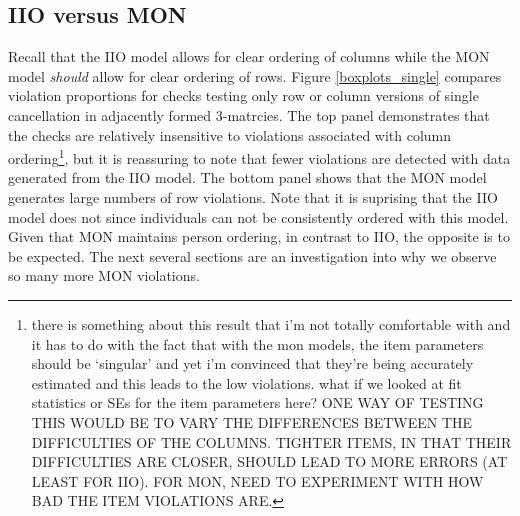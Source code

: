 \documentclass[12pt]{article}
\begin{document}
\subsection{IIO versus MON} \label{iio_mon}
Recall that the IIO model allows for clear ordering of columns while the MON model {\em should} allow for clear ordering of rows. Figure \ref{boxplots_single} compares violation proportions for checks testing only row or column versions of single cancellation in adjacently formed 3-matrcies. The top panel demonstrates that the checks are relatively insensitive to violations associated with column ordering\footnote{there is something about this result that i'm not totally comfortable with and it has to do with the fact that with the mon models, the item parameters should be `singular' and yet i'm convinced that they're being accurately estimated and this leads to the low violations. what if we looked at fit statistics or SEs for the item parameters here?
ONE WAY OF TESTING THIS WOULD BE TO VARY THE DIFFERENCES BETWEEN THE DIFFICULTIES OF THE COLUMNS. TIGHTER ITEMS, IN THAT THEIR DIFFICULTIES ARE CLOSER, SHOULD LEAD TO MORE ERRORS (AT LEAST FOR IIO). FOR MON, NEED TO EXPERIMENT WITH HOW BAD THE ITEM VIOLATIONS ARE.}, but it is reassuring to note that fewer violations are detected with data generated from the IIO model. The bottom panel shows that the MON model generates large numbers of row violations. Note that it is suprising that the IIO model does not since individuals can not be consistently ordered with this model.  Given that MON maintains person ordering, in contrast to IIO, the opposite is to be expected. The next several sections are an investigation into why we observe so many more MON violations. 
\end{document}
